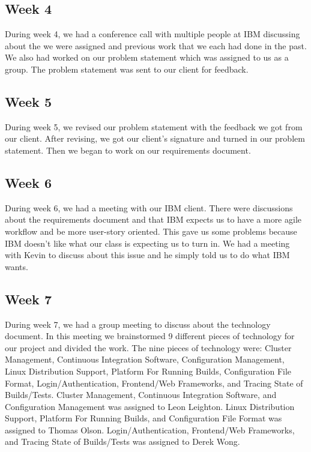 \documentclass[10pt,onecolumn,journal,draftclsnofoot]{IEEEtran}
\begin{document}
\subsection{Week 4}
During week 4, we had a conference call with multiple people at IBM discussing about the we were assigned and previous work that we each had done in the past. We also had worked on our problem statement which was assigned to us as a group. The problem statement was sent to our client for feedback.

\subsection{Week 5}
During week 5, we revised our problem statement with the feedback we got from our client. After revising, we got our client's signature and turned in our problem statement. Then we began to work on our requirements document. 

\subsection{Week 6}
During week 6, we had a meeting with our IBM client. There were discussions about the requirements document and that
IBM expects us to have a more agile workflow and be more user-story oriented. This gave us some problems because IBM
doesn't like what our class is expecting us to turn in. We had a meeting with Kevin to discuss about this issue and he simply
told us to do what IBM wants.

\subsection{Week 7}
During week 7, we had a group meeting to discuss about the technology document. In this meeting we brainstormed 9 different pieces of technology for our project and divided the work. The nine pieces of technology were: Cluster Management, Continuous Integration Software, Configuration Management, Linux Distribution Support, Platform For Running Builds, Configuration File Format, Login/Authentication, Frontend/Web Frameworks, and Tracing State of Builds/Tests. Cluster Management, Continuous Integration Software, and Configuration Management was assigned to Leon Leighton. Linux Distribution Support, Platform For Running Builds, and Configuration File Format was assigned to Thomas Olson. Login/Authentication, Frontend/Web Frameworks, and Tracing State of Builds/Tests was assigned to Derek Wong.
\end{document}
